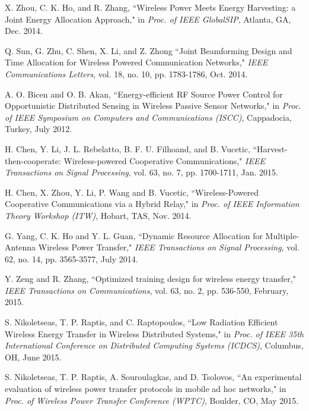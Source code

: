 \documentclass[twocolumn,10pt]{IEEEtran}
\begin{document}
\begin{thebibliography}{99}
X. Zhou, C. K. Ho, and R. Zhang, ``Wireless Power Meets Energy Harvesting: a Joint Energy Allocation Approach," in \emph{Proc. of IEEE GlobalSIP}, Atlanta, GA, Dec. 2014. 

Q. Sun, G. Zhu, C. Shen, X. Li, and Z. Zhong 
``Joint Beamforming Design and Time Allocation for Wireless Powered Communication Networks," \emph{IEEE Communications Letters}, vol. 18, no. 10, pp. 1783-1786, Oct. 2014.



A. O. Bicen and O. B. Akan, ``Energy-efficient RF Source Power Control for Opportunistic Distributed Sensing in Wireless Passive Sensor Networks," in \emph{Proc. of IEEE Symposium on 
Computers and Communications (ISCC)}, Cappadocia, Turkey, July 2012.

H. Chen, Y. Li, J. L. Rebelatto, B. F. U. Filhoand, and B. Vucetic, ``Harvest-then-cooperate: Wireless-powered Cooperative Communications,"  \emph{IEEE Transactions on Signal Processing}, vol. 63, no. 7, pp. 1700-1711, Jan. 2015.

 

H. Chen, X. Zhou, Y. Li, P. Wang and B. Vucetic, ``Wireless-Powered Cooperative Communications via a Hybrid Relay," in \emph{Proc. of IEEE Information Theory Workshop (ITW)}, Hobart, TAS, Nov. 2014.
 
 
G. Yang, C. K. Ho and Y. L. Guan, ``Dynamic Resource Allocation for Multiple-Antenna Wireless Power Transfer,"  \emph{IEEE Transactions on Signal Processing}, vol. 62, no. 14, pp. 3565-3577, July 2014.



Y. Zeng and R. Zhang, ``Optimized training design for wireless energy transfer," \emph{IEEE Transactions on Communications}, vol. 63, no. 2, pp. 536-550, February, 2015.

S. Nikoletseas, T. P. Raptis, and C. Raptopoulos, ``Low Radiation Efficient Wireless Energy Transfer in Wireless Distributed Systems," in \emph{Proc. of IEEE 35th International Conference on Distributed Computing Systems (ICDCS)}, Columbus, OH, June 2015. 

S. Nikoletseas, T. P. Raptis, A. Souroulagkas, and D. Tsolovos, ``An experimental evaluation of wireless power transfer protocols in mobile ad hoc networks," in \emph{Proc. of 
Wireless Power Transfer Conference (WPTC)}, Boulder, CO, May 2015.


\end{thebibliography}
\end{document}
